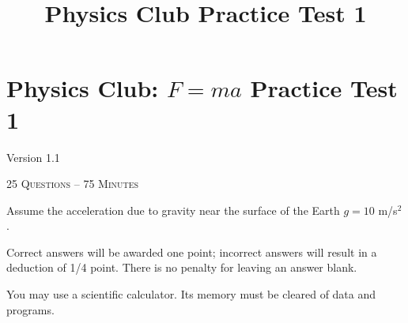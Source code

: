 \documentclass[12pt,letterpaper]{article}
\title{Physics Club Practice Test 1}
\begin{document}
\section*{Physics Club: $F=ma$ Practice Test 1}\hfill Version 1.1
\vspace{-2.5pt}
\begin{center}
\textsc{25 Questions -- 75 Minutes}
\end{center}
\vspace{-5pt}
Assume the acceleration due to gravity near the surface of the Earth $g = 10$ m/s$^2$.
\smallskip

Correct answers will be awarded one point; incorrect answers will result in a deduction of 1/4 point. There is no penalty for leaving an answer blank.
\smallskip

You may use a scientific calculator. Its memory must be cleared of data and programs.

\hrulefill
\end{document}

